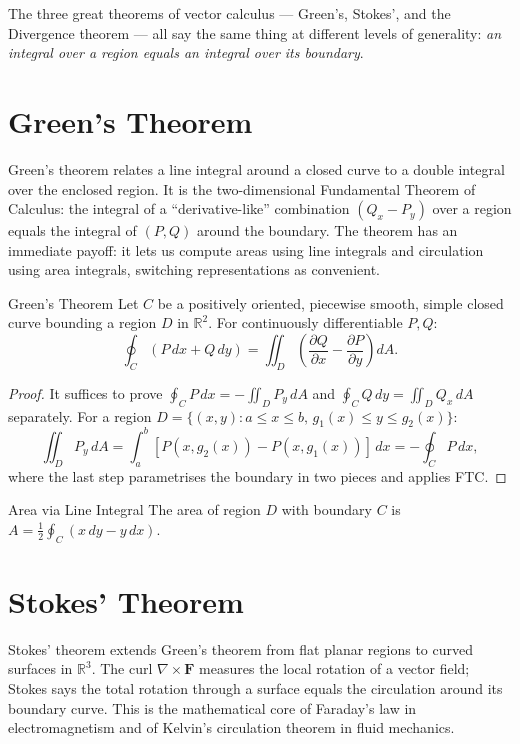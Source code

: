 \documentclass[12pt, openany]{book}
\theoremstyle{plain}
\theoremstyle{definition}
\theoremstyle{remark}
\newcommand{\R}{\mathbb{R}}
\begin{document}
The three great theorems of vector calculus --- Green's, Stokes', and the Divergence
theorem --- all say the same thing at different levels of generality: \emph{an
integral over a region equals an integral over its boundary}.

\section{Green's Theorem}

Green's theorem relates a line integral around a closed curve to a double integral over the enclosed region.  It is the two-dimensional Fundamental Theorem of Calculus: the integral of a ``derivative-like'' combination $(Q_x - P_y)$ over a region equals the integral of $(P, Q)$ around the boundary.  The theorem has an immediate payoff: it lets us compute areas using line integrals and circulation using area integrals, switching representations as convenient.

\begin{thmbox}{Green's Theorem}
Let $C$ be a positively oriented, piecewise smooth, simple closed curve bounding
a region $D$ in $\R^2$.  For continuously differentiable $P,Q$:
\[\oint_C (P\,dx + Q\,dy)
  = \iint_D \left(\frac{\partial Q}{\partial x} - \frac{\partial P}{\partial y}\right)dA.\]
\end{thmbox}
\color{black}

\begin{proof}
It suffices to prove $\oint_C P\,dx = -\iint_D P_y\,dA$ and
$\oint_C Q\,dy = \iint_D Q_x\,dA$ separately.
For a region $D=\{(x,y):a\leq x\leq b,\,g_1(x)\leq y\leq g_2(x)\}$:
\[\iint_D P_y\,dA = \int_a^b [P(x,g_2(x))-P(x,g_1(x))]\,dx = -\oint_C P\,dx,\]
where the last step parametrises the boundary in two pieces and applies FTC.
\end{proof}

\begin{corbox}{Area via Line Integral}
The area of region $D$ with boundary $C$ is
$A=\frac{1}{2}\oint_C (x\,dy - y\,dx)$.
\end{corbox}
\color{black}

\section{Stokes' Theorem}

Stokes' theorem extends Green's theorem from flat planar regions to curved surfaces in $\R^3$.  The curl $\nabla \times \mathbf{F}$ measures the local rotation of a vector field; Stokes says the total rotation through a surface equals the circulation around its boundary curve.  This is the mathematical core of Faraday's law in electromagnetism and of Kelvin's circulation theorem in fluid mechanics.
\end{document}
